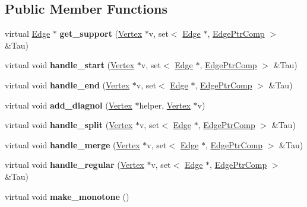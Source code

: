 \subsection*{Public Member Functions}
\begin{DoxyCompactItemize}
\item 
\mbox{\label{structDCEL_a9ba659c772047cd7867f49945a557152}} 
virtual \hyperlink{structEdge}{Edge} $\ast$ {\bfseries get\+\_\+support} (\hyperlink{structVertex}{Vertex} $\ast$v, set$<$ \hyperlink{structEdge}{Edge} $\ast$, \hyperlink{structDCEL_1_1EdgePtrComp}{Edge\+Ptr\+Comp} $>$ \&Tau)
\item 
\mbox{\label{structDCEL_a9efcd9a2e78efac4f71931946cdff606}} 
virtual void {\bfseries handle\+\_\+start} (\hyperlink{structVertex}{Vertex} $\ast$v, set$<$ \hyperlink{structEdge}{Edge} $\ast$, \hyperlink{structDCEL_1_1EdgePtrComp}{Edge\+Ptr\+Comp} $>$ \&Tau)
\item 
\mbox{\label{structDCEL_a8fd85fb5dbe52c27fd49e465222ea05d}} 
virtual void {\bfseries handle\+\_\+end} (\hyperlink{structVertex}{Vertex} $\ast$v, set$<$ \hyperlink{structEdge}{Edge} $\ast$, \hyperlink{structDCEL_1_1EdgePtrComp}{Edge\+Ptr\+Comp} $>$ \&Tau)
\item 
\mbox{\label{structDCEL_afd1b47312ef100985cb59f5019f49e01}} 
virtual void {\bfseries add\+\_\+diagnol} (\hyperlink{structVertex}{Vertex} $\ast$helper, \hyperlink{structVertex}{Vertex} $\ast$v)
\item 
\mbox{\label{structDCEL_a1cfc774b59a157b111be2db2ad6a2f5d}} 
virtual void {\bfseries handle\+\_\+split} (\hyperlink{structVertex}{Vertex} $\ast$v, set$<$ \hyperlink{structEdge}{Edge} $\ast$, \hyperlink{structDCEL_1_1EdgePtrComp}{Edge\+Ptr\+Comp} $>$ \&Tau)
\item 
\mbox{\label{structDCEL_a4567bbbac7a706cf4d51199e63e7ac5b}} 
virtual void {\bfseries handle\+\_\+merge} (\hyperlink{structVertex}{Vertex} $\ast$v, set$<$ \hyperlink{structEdge}{Edge} $\ast$, \hyperlink{structDCEL_1_1EdgePtrComp}{Edge\+Ptr\+Comp} $>$ \&Tau)
\item 
\mbox{\label{structDCEL_a0e9b658feb6fadea3ca47bd91eca85bc}} 
virtual void {\bfseries handle\+\_\+regular} (\hyperlink{structVertex}{Vertex} $\ast$v, set$<$ \hyperlink{structEdge}{Edge} $\ast$, \hyperlink{structDCEL_1_1EdgePtrComp}{Edge\+Ptr\+Comp} $>$ \&Tau)
\item 
\mbox{\label{structDCEL_a5713f17e9d21cc2a77f49bd8dbf0821d}} 
virtual void {\bfseries make\+\_\+monotone} ()
\end{DoxyCompactItemize}
